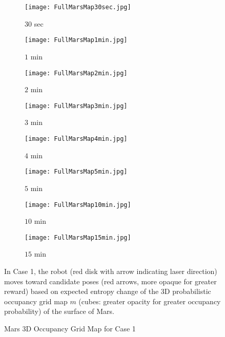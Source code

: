 \begin{figure}[!t]
	\centering
	\begin{subfigure}[t]{0.49\columnwidth}
           	\centering
          	\texttt{[image: FullMarsMap30sec.jpg]}
        		\caption{$30$ sec}
		\vspace*{0.025\textwidth}
    	\end{subfigure}
    	\begin{subfigure}[t]{0.49\columnwidth}
           	\centering
          	\texttt{[image: FullMarsMap1min.jpg]}
        		\caption{$1$ min}
		\vspace*{0.025\textwidth}
    	\end{subfigure}
	\centering
	\begin{subfigure}[t]{0.49\columnwidth}
           	\centering
          	\texttt{[image: FullMarsMap2min.jpg]}
        		\caption{$2$ min}
		\vspace*{0.025\textwidth}
    	\end{subfigure}
    	\begin{subfigure}[t]{0.49\columnwidth}
           	\centering
          	\texttt{[image: FullMarsMap3min.jpg]}
        		\caption{$3$ min}
		\vspace*{0.025\textwidth}
    	\end{subfigure}
	\centering
	\begin{subfigure}[t]{0.49\columnwidth}
           	\centering
          	\texttt{[image: FullMarsMap4min.jpg]}
        		\caption{$4$ min}
		\vspace*{0.025\textwidth}
    	\end{subfigure}
    	\begin{subfigure}[t]{0.49\columnwidth}
           	\centering
          	\texttt{[image: FullMarsMap5min.jpg]}
        		\caption{$5$ min}
		\vspace*{0.025\textwidth}
    	\end{subfigure}
	\centering
	\begin{subfigure}[t]{0.49\columnwidth}
           	\centering
          	\texttt{[image: FullMarsMap10min.jpg]}
        		\caption{$10$ min}
		\vspace*{0.025\textwidth}
    	\end{subfigure}
    	\begin{subfigure}[t]{0.49\columnwidth}
           	\centering
          	\texttt{[image: FullMarsMap15min.jpg]}
        		\caption{$15$ min}
		\vspace*{0.025\textwidth}
    	\end{subfigure}
\caption{Mars 3D Occupancy Grid Map for Case 1}
	\medskip
	\small
	In Case 1, the robot (red disk with arrow indicating laser direction) moves toward candidate poses (red arrows, more opaque for greater reward) based on expected entropy change of the 3D probabilistic occupancy grid map $m$ (cubes: greater opacity for greater occupancy probability) of the surface of Mars.
\label{fig:mars3DogmCase1}
\end{figure}


